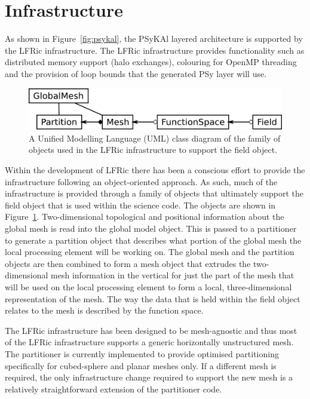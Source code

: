 \documentclass[review,times]{elsarticle}
\begin{document}
\section{\label{sec:lib}Infrastructure}

As shown in Figure~\ref{fig:psykal}, the PSyKAl layered
architecture is supported by the LFRic infrastructure. The LFRic infrastructure provides
functionality such as distributed memory support (halo exchanges),
colouring for OpenMP threading and the provision of loop bounds that the
generated PSy layer will use.

\begin{figure}
\centering\includegraphics[width=0.8\linewidth]{Fig4_FieldClass.pdf}
\caption{\label{fig:objects} A Unified Modelling Language (UML) 
class diagram of the family of objects used
in the LFRic infrastructure to support the field object.}
\end{figure}

Within the development of LFRic there has been a conscious effort to
provide the infrastructure following an object-oriented approach. As
such, much of the infrastructure is provided through a family of
objects that ultimately support the field object that is used within the
science code. The objects are shown in
Figure~\ref{fig:objects}. Two-dimensional topological and positional
information about the global mesh is read into the global model object.
This is passed to a partitioner to generate a partition object that
describes what portion of the global mesh the local processing element
will be working on. The global mesh and the partition objects are then
combined to form a mesh object that extrudes the two-dimensional mesh
information in the vertical for just the part of the mesh that will be
used on the local processing element to form a local, three-dimensional
representation of the mesh. The way the data that is held within the
field object relates to the mesh is described by the function space.

The LFRic infrastructure has been designed to be mesh-agnostic and
thus most of the LFRic infrastructure supports a generic horizontally
unstructured mesh. The partitioner is currently implemented to provide
optimised partitioning specifically for cubed-sphere and planar meshes only.
If a different mesh is required, the only infrastructure change required
to support the new mesh is a relatively straightforward extension of the
partitioner code. 
\end{document}
